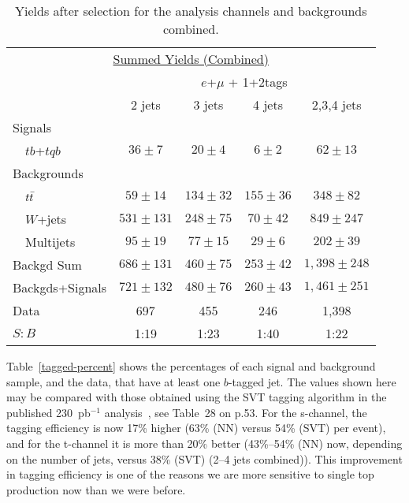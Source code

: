 \clearpage


\begin{table}[!h!tbp]
\begin{center}
\begin{minipage}{4.5in}
\begin{ruledtabular}
\begin{tabular}{l|cccc}
\multicolumn{5}{c}{\hspace{1in}\underline{Summed Yields (Combined)}} \vspace{0.05in} \\
& \multicolumn{4}{c}{$e$+$\mu$ + 1+2tags} \\
                   &     2 jets    &     3 jets    &     4 jets    &    2,3,4 jets   \\
\hline		                                                   
Signals            &               &               &               &                 \\
~~$tb$+$tqb$       &   $36 \pm 7$  &   $20 \pm 4$  &    $6 \pm 2$  &    $62 \pm 13$  \\
Backgrounds        &               &               &               &                 \\
~~${\mbox{$t\bar{t}$}}$       &   $59 \pm 14$ &  $134 \pm 32$ &  $155 \pm 36$ &   $348 \pm 82$  \\
~~$W$+jets         &  $531 \pm131$ &  $248 \pm 75$ &   $70 \pm 42$ &   $849 \pm 247$ \\
~~Multijets        &   $95 \pm 19$ &   $77 \pm 15$ &   $29 \pm 6$  &   $202 \pm 39$  \\
Backgd Sum         &  $686 \pm131$ &  $460 \pm 75$ &  $253 \pm 42$ & $1,398 \pm 248$ \\
Backgds+Signals    &  $721 \pm132$ &  $480 \pm 76$ &  $260 \pm 43$ & $1,461 \pm 251$ \\
Data               &       697     &       455     &       246     &       1,398     \\
$S:B$              &      1:19     &      1:23     &      1:40     &       1:22      
\end{tabular}
\end{ruledtabular}
\vspace{-0.1in}
\caption[allchansyieldsshort]{Yields after selection for the analysis
channels and backgrounds combined.}
\label{allchans-yields-short}
\end{minipage}
\end{center}
\end{table}

Table~\ref{tagged-percent} shows the percentages of each signal and
background sample, and the data, that have at least one $b$-tagged
jet. The values shown here may be compared with those obtained using
the SVT tagging algorithm in the published 230~pb$^{-1}$
analysis~\cite{run2-d0-230}, see Table~28 on p.53. For the s-channel,
the tagging efficiency is now 17\% higher (63\% (NN) versus 54\% (SVT)
per event), and for the t-channel it is more than 20\% better
(43\%--54\% (NN) now, depending on the number of jets, versus 38\%
(SVT) (2--4 jets combined)). This improvement in tagging efficiency is
one of the reasons we are more sensitive to single top production now
than we were before.

